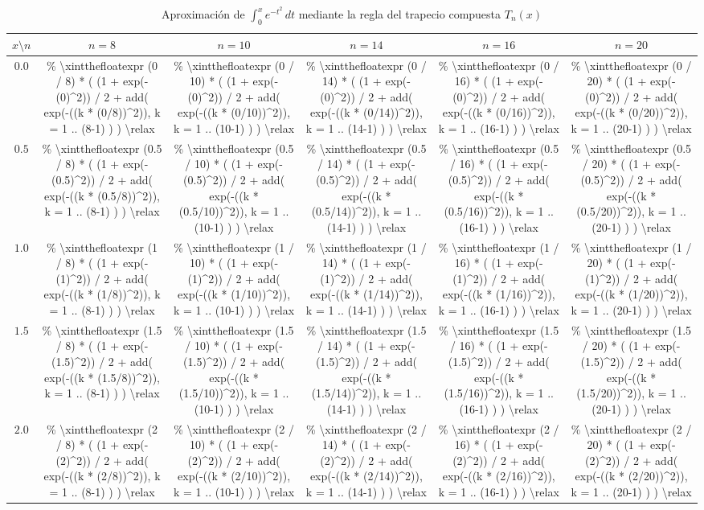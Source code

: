 \documentclass{article}
\newcommand{\trxn}[2]{%
	\num{%
		\xintthefloatexpr
		(#1 / #2) * ( (1 + exp(-(#1)^2)) / 2
		+ add( exp(-((k * (#1/#2))^2)), k = 1 .. (#2-1) ) )
		\relax
	}%
}
\begin{document}
	
	\begin{table}[ht]
		\centering
		\caption{Aproximación de $\displaystyle\int_0^x e^{-t^2}\,dt$
			mediante la regla del trapecio compuesta $T_n(x)$}
		\smallskip
		\begin{tabular}{c *{5}{S[table-format=1.8]}}
			\toprule
			{$x \setminus n$}
			& {$n = 8$}  & {$n = 10$} & {$n = 14$}
			& {$n = 16$} & {$n = 20$} \\
			\midrule
			$0.0$ & \trxn{0}{8}   & \trxn{0}{10}   & \trxn{0}{14}
			& \trxn{0}{16}  & \trxn{0}{20}   \\[2pt]
			$0.5$ & \trxn{0.5}{8} & \trxn{0.5}{10} & \trxn{0.5}{14}
			& \trxn{0.5}{16}& \trxn{0.5}{20} \\[2pt]
			$1.0$ & \trxn{1}{8}   & \trxn{1}{10}   & \trxn{1}{14}
			& \trxn{1}{16}  & \trxn{1}{20}   \\[2pt]
			$1.5$ & \trxn{1.5}{8} & \trxn{1.5}{10} & \trxn{1.5}{14}
			& \trxn{1.5}{16}& \trxn{1.5}{20} \\[2pt]
			$2.0$ & \trxn{2}{8}   & \trxn{2}{10}   & \trxn{2}{14}
			& \trxn{2}{16}  & \trxn{2}{20}   \\
			\bottomrule
		\end{tabular}
	\end{table}
	
\end{document}
